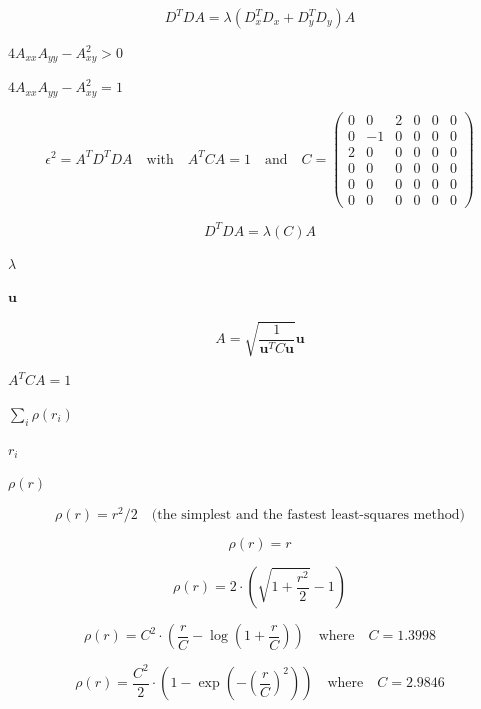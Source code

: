 \documentclass{article}
\begin{document}
\begin{equation*}D^T D A = \lambda  \left( D_x^T D_x +  D_y^T D_y\right) A
\end{equation*}
\pagebreak

$ 4 A_{xx} A_{yy}- A_{xy}^2 > 0 $
\pagebreak

$ 4 A_{xx} A_{yy}- A_{xy}^2=1 $
\pagebreak

\begin{equation*}\epsilon ^2= A^T D^T D A \quad \text{with} \quad A^T C A =1 \quad \text{and} \quad C=\left(\begin{matrix}
0 & 0  & 2  & 0  & 0  &  0  \\
0 & -1  & 0  & 0  & 0  &  0 \\
2 & 0  & 0  & 0  & 0  &  0 \\
0 & 0  & 0  & 0  & 0  &  0 \\
0 & 0  & 0  & 0  & 0  &  0 \\
0 & 0  & 0  & 0  & 0  &  0
\end{matrix} \right)
\end{equation*}
\pagebreak

\begin{equation*}D^T D A = \lambda  \left( C\right) A
\end{equation*}
\pagebreak

$ \lambda$
\pagebreak

$\mathbf{u}$
\pagebreak

\begin{equation*}A = \sqrt{\frac{1}{\mathbf{u}^T C \mathbf{u}}}  \mathbf{u}
\end{equation*}
\pagebreak

$A^T C A =1$
\pagebreak

$\sum_i \rho(r_i)$
\pagebreak

$r_i$
\pagebreak

$\rho(r)$
\pagebreak

\[\rho (r) = r^2/2  \quad \text{(the simplest and the fastest least-squares method)}\]
\pagebreak

\[\rho (r) = r\]
\pagebreak

\[\rho (r) = 2  \cdot ( \sqrt{1 + \frac{r^2}{2}} - 1)\]
\pagebreak

\[\rho \left (r \right ) = C^2  \cdot \left (  \frac{r}{C} -  \log{\left(1 + \frac{r}{C}\right)} \right )  \quad \text{where} \quad C=1.3998\]
\pagebreak

\[\rho \left (r \right ) =  \frac{C^2}{2} \cdot \left ( 1 -  \exp{\left(-\left(\frac{r}{C}\right)^2\right)} \right )  \quad \text{where} \quad C=2.9846\]
\pagebreak
\end{document}

